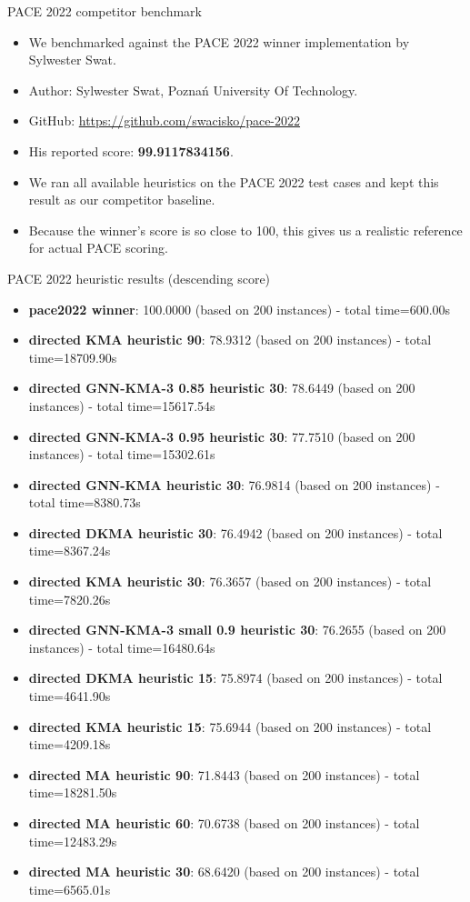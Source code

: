 \documentclass[aspectratio=169]{beamer}
\begin{document}
\begin{frame}{PACE 2022 competitor benchmark}
	\begin{itemize}
		\item We benchmarked against the PACE 2022 winner implementation by Sylwester Swat.
		\item Author: Sylwester Swat, Pozna\'n University Of Technology.
		\item GitHub: \url{https://github.com/swacisko/pace-2022}
		\item His reported score: \textbf{99.9117834156}.
		\item We ran all available heuristics on the PACE 2022 test cases and kept this result as our competitor baseline.
		\item Because the winner's score is so close to 100, this gives us a realistic reference for actual PACE scoring.
	\end{itemize}
\end{frame}

\begin{frame}{PACE 2022 heuristic results (descending score)}
	\small
	\begin{itemize}
		\item \textbf{pace2022 winner}: 100.0000 (based on 200 instances) - total time=600.00s
		\item \textbf{directed KMA heuristic 90}: 78.9312 (based on 200 instances) - total time=18709.90s
		\item \textbf{directed GNN-KMA-3 0.85 heuristic 30}: 78.6449 (based on 200 instances) - total time=15617.54s
		\item \textbf{directed GNN-KMA-3 0.95 heuristic 30}: 77.7510 (based on 200 instances) - total time=15302.61s
		\item \textbf{directed GNN-KMA heuristic 30}: 76.9814 (based on 200 instances) - total time=8380.73s
		\item \textbf{directed DKMA heuristic 30}: 76.4942 (based on 200 instances) - total time=8367.24s
		\item \textbf{directed KMA heuristic 30}: 76.3657 (based on 200 instances) - total time=7820.26s
		\item \textbf{directed GNN-KMA-3 small 0.9 heuristic 30}: 76.2655 (based on 200 instances) - total time=16480.64s
		\item \textbf{directed DKMA heuristic 15}: 75.8974 (based on 200 instances) - total time=4641.90s
		\item \textbf{directed KMA heuristic 15}: 75.6944 (based on 200 instances) - total time=4209.18s
		\item \textbf{directed MA heuristic 90}: 71.8443 (based on 200 instances) - total time=18281.50s
		\item \textbf{directed MA heuristic 60}: 70.6738 (based on 200 instances) - total time=12483.29s
		\item \textbf{directed MA heuristic 30}: 68.6420 (based on 200 instances) - total time=6565.01s
	\end{itemize}
\end{frame}
\end{document}
